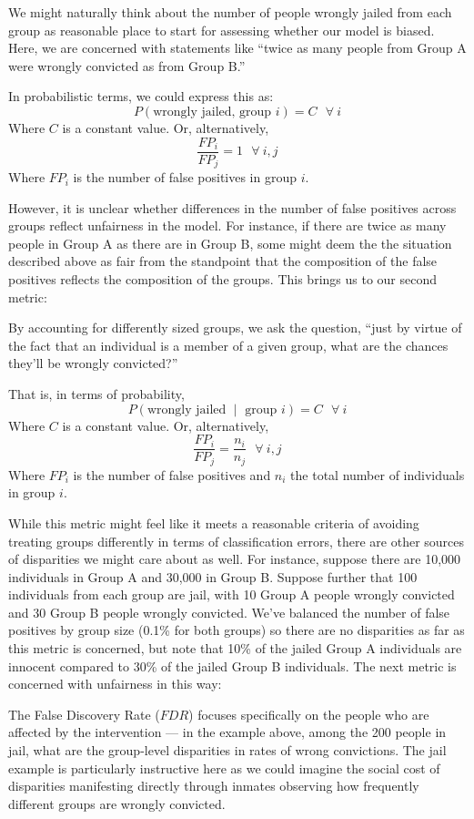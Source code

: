 \documentclass[]{krantz}
\begin{document}
We might naturally think about the number of people wrongly jailed from
each group as reasonable place to start for assessing whether our model
is biased. Here, we are concerned with statements like ``twice as many
people from Group A were wrongly convicted as from Group B.''

In probabilistic terms, we could express this as:
\[P(\textrm{wrongly jailed, group $i$}) = C~~~\forall~i\] Where \(C\) is
a constant value. Or, alternatively,
\[\frac{FP_i}{FP_j} = 1~~~\forall~i,j\] Where \(FP_i\) is the number of
false positives in group \(i\).

However, it is unclear whether differences in the number of false
positives across groups reflect unfairness in the model. For instance,
if there are twice as many people in Group A as there are in Group B,
some might deem the the situation described above as fair from the
standpoint that the composition of the false positives reflects the
composition of the groups. This brings us to our second metric:

By accounting for differently sized groups, we ask the question, ``just
by virtue of the fact that an individual is a member of a given group,
what are the chances they'll be wrongly convicted?''

That is, in terms of probability,
\[P(\textrm{wrongly jailed $\mid$ group $i$}) = C~~~\forall~i\] Where
\(C\) is a constant value. Or, alternatively,
\[\frac{FP_i}{FP_j} = \frac{n_i}{n_j}~~~\forall~i,j\] Where \(FP_i\) is
the number of false positives and \(n_i\) the total number of
individuals in group \(i\).

While this metric might feel like it meets a reasonable criteria of
avoiding treating groups differently in terms of classification errors,
there are other sources of disparities we might care about as well. For
instance, suppose there are 10,000 individuals in Group A and 30,000 in
Group B. Suppose further that 100 individuals from each group are jail,
with 10 Group A people wrongly convicted and 30 Group B people wrongly
convicted. We've balanced the number of false positives by group size
(0.1\% for both groups) so there are no disparities as far as this
metric is concerned, but note that 10\% of the jailed Group A
individuals are innocent compared to 30\% of the jailed Group B
individuals. The next metric is concerned with unfairness in this way:

The False Discovery Rate (\(FDR\)) focuses specifically on the people
who are affected by the intervention --- in the example above, among the
200 people in jail, what are the group-level disparities in rates of
wrong convictions. The jail example is particularly instructive here as
we could imagine the social cost of disparities manifesting directly
through inmates observing how frequently different groups are wrongly
convicted.
\end{document}
